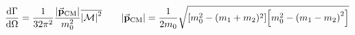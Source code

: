 \begin{equation*}
        \dv{\Gamma}{\Omega} = \frac{1}{32\pi^2}\frac{\abs{\va{p}_{\mathrm{CM}}}}{m_0^2}\overline{\abs{\operatorname{\mathcal{M}}}^2}
        \qquad
        \abs{\va{p}_{\mathrm{CM}}} = \frac{1}{2m_0}\sqrt{\qty[m_0^2 - (m_1+m_2)^2]\qty[m_0^2 - \qty(m_1-m_2)^2]}
\end{equation*}
